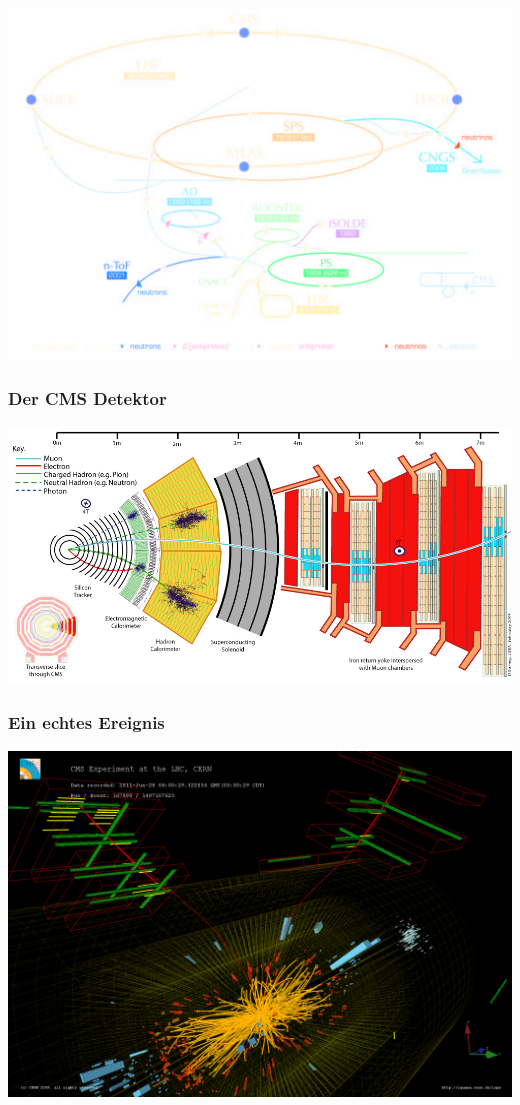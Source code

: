 \documentclass[14pt]{beamer}
\begin{document}
\begin{frame}
	\centering
	\includegraphics[width=\textwidth]{cern.png}
\end{frame}

\begin{frame}
	\frametitle{Der CMS Detektor}
	\begin{center}
		\includegraphics[width=\textwidth]{messprinzip.png}
	\end{center}
\end{frame}

\begin{frame}
	\frametitle{Ein echtes Ereignis}
	\begin{center}
		\includegraphics[width=\textwidth]{dimuon_event.png}
	\end{center}
\end{frame}
\end{document}

